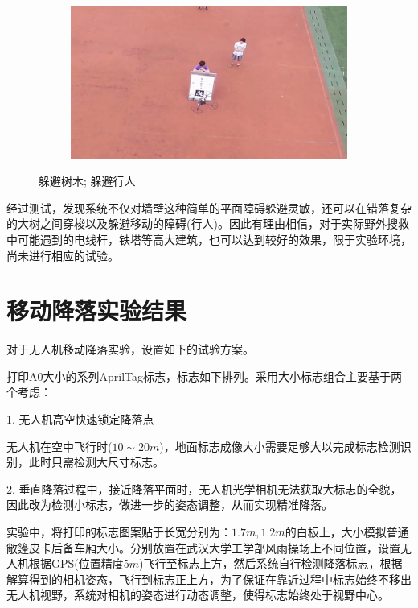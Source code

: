 \begin{figure}[h]
\begin{subfigure}[h]{0.475\textwidth}
    \end{subfigure}
    ~
    \begin{subfigure}[h]{0.475\textwidth}    
        \includegraphics[width=\textwidth]{figures/自主避障4.jpg}   
    \end{subfigure}

    \caption{躲避树木; 躲避行人}\label{Avoid}
\end{figure}

经过测试，发现系统不仅对墙壁这种简单的平面障碍躲避灵敏，还可以在错落复杂的大树之间穿梭以及躲避移动的障碍(行人)。因此有理由相信，对于实际野外搜救中可能遇到的电线杆，铁塔等高大建筑，也可以达到较好的效果，限于实验环境，尚未进行相应的试验。


\section{移动降落实验结果}

对于无人机移动降落实验，设置如下的试验方案。

打印A0大小的系列AprilTag标志，标志如下排列。采用大小标志组合主要基于两个考虑：

1. 无人机高空快速锁定降落点

无人机在空中飞行时($10\sim20m$)，地面标志成像大小需要足够大以完成标志检测识别，此时只需检测大尺寸标志。

2. 垂直降落过程中，接近降落平面时，无人机光学相机无法获取大标志的全貌，因此改为检测小标志，做进一步的姿态调整，从而实现精准降落。

实验中，将打印的标志图案贴于长宽分别为：$1.7m,1.2m$的白板上，大小模拟普通敞篷皮卡后备车厢大小。分别放置在武汉大学工学部风雨操场上不同位置，设置无人机根据GPS(位置精度$5m$)飞行至标志上方，然后系统自行检测降落标志，根据解算得到的相机姿态，飞行到标志正上方，为了保证在靠近过程中标志始终不移出无人机视野，系统对相机的姿态进行动态调整，使得标志始终处于视野中心。

